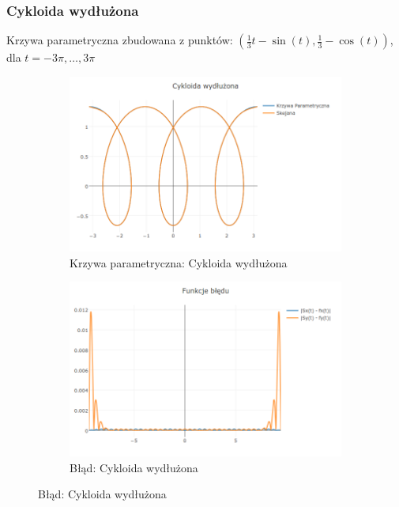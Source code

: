 \documentclass{article}
\begin{document}
	\subsubsection{Cykloida wydłużona}
	Krzywa parametryczna zbudowana z punktów: $(
\frac{1}{3}t-\sin(t), \frac{1}{3}-\cos(t) )$, dla $t= -3\pi,\dots,3\pi$
	\begin{figure}[h]
		\centering
		\begin{subfigure}{.44\textwidth}
			\includegraphics[width=\textwidth]{newplot(6).png}
			\caption{Krzywa parametryczna: Cykloida wydłużona}
			\label{Wykres:Cykloida}
		\end{subfigure}
		\begin{subfigure}{.44\textwidth}
			\includegraphics[width=\textwidth]{newplot(7).png}
			\caption{Błąd: Cykloida wydłużona}
			\label{Blad:Cykloida}
		\end{subfigure}
	\end{figure}
\end{document}

